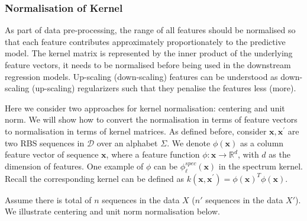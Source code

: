 
\subsubsection{Normalisation of Kernel}
\label{supp: Normalisation of Kernel}

As part of data pre-processing,
the range of all features should be normalised so that each feature contributes approximately proportionately to the predictive model. 
The kernel matrix is represented by the inner product of the underlying feature vectors, it needs to be normalised before being used in the downstream regression models. 
Up-scaling (down-scaling) features can be understood as down-scaling (up-scaling) regularizers such that they penalise the features less (more). 

Here we consider two approaches for kernel normalisation: centering and unit norm. 
We will show how to convert the normalisation in terms of feature vectors to normalisation in terms of kernel matrices. 
As defined before, consider $\mathbf{x}, \mathbf{x}^\prime$ are two RBS sequences in $\mathcal{D}$ over an alphabet $\Sigma$.
We denote $\phi(\mathbf{x})$ as a column feature vector of sequence $\mathbf{x}$, 
where a feature function $\phi: \mathbf{x} \rightarrow \mathbb{R}^d$,
with $d$ as the dimension of features.
One example of $\phi$ can be $\phi_\ell^{spec}(\mathbf{x})$ in the spectrum kernel.
Recall the corresponding kernel can be defined as $k(\mathbf{x}, \mathbf{x}^\prime) = \phi(\mathbf{x})^T \phi(\mathbf{x}).$

Assume there is total of $n$ sequences in the data $X$ ($n'$ sequences in the data $X'$). 
We illustrate centering and unit norm normalisation below. 

